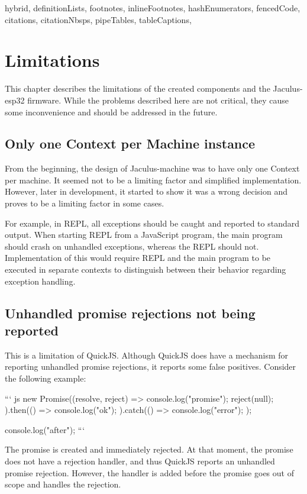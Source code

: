 \begin{markdown*}{%
  hybrid,
  definitionLists,
  footnotes,
  inlineFootnotes,
  hashEnumerators,
  fencedCode,
  citations,
  citationNbsps,
  pipeTables,
  tableCaptions,
}

\chapter{Limitations}

This chapter describes the limitations of the created components and the Jaculus-esp32 firmware. While the problems described here are not critical, they cause some inconvenience and should be addressed in the future.

\section{Only one Context per Machine instance}

From the beginning, the design of Jaculus-machine was to have only one Context per machine. It seemed not to be a limiting factor and simplified implementation. However, later in development, it started to show it was a wrong decision and proves to be a limiting factor in some cases.

For example, in REPL, all exceptions should be caught and reported to standard output. When starting REPL from a JavaScript program, the main program should crash on unhandled exceptions, whereas the REPL should not. Implementation of this would require REPL and the main program to be executed in separate contexts to distinguish between their behavior regarding exception handling.


\section{Unhandled promise rejections not being reported}

This is a limitation of QuickJS. Although QuickJS does have a mechanism for reporting unhandled promise rejections, it reports some false positives. Consider the following example:

``` js
new Promise((resolve, reject) => {
    console.log("promise");
    reject(null);
}).then(() => {
    console.log("ok");
}).catch(() => {
    console.log("error");
});

console.log("after");
```

The promise is created and immediately rejected. At that moment, the promise does not have a rejection handler, and thus QuickJS reports an unhandled promise rejection. However, the handler is added before the promise goes out of scope and handles the rejection.


\end{markdown*}
